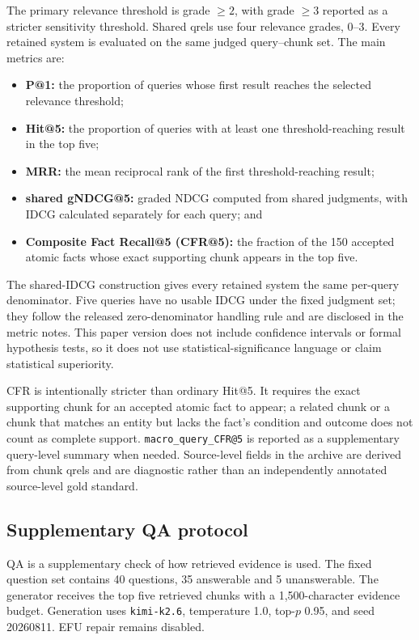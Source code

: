 The primary relevance threshold is grade $\geq 2$, with grade $\geq 3$ reported as a stricter sensitivity threshold. Shared qrels use four relevance grades, 0--3. Every retained system is evaluated on the same judged query--chunk set. The main metrics are:

\begin{itemize}
\item \textbf{P@1:} the proportion of queries whose first result reaches the selected relevance threshold;
\item \textbf{Hit@5:} the proportion of queries with at least one threshold-reaching result in the top five;
\item \textbf{MRR:} the mean reciprocal rank of the first threshold-reaching result;
\item \textbf{shared gNDCG@5:} graded NDCG computed from shared judgments, with IDCG calculated separately for each query; and
\item \textbf{Composite Fact Recall@5 (CFR@5):} the fraction of the 150 accepted atomic facts whose exact supporting chunk appears in the top five.
\end{itemize}

The shared-IDCG construction gives every retained system the same per-query denominator. Five queries have no usable IDCG under the fixed judgment set; they follow the released zero-denominator handling rule and are disclosed in the metric notes. This paper version does not include confidence intervals or formal hypothesis tests, so it does not use statistical-significance language or claim statistical superiority.

CFR is intentionally stricter than ordinary Hit@5. It requires the exact supporting chunk for an accepted atomic fact to appear; a related chunk or a chunk that matches an entity but lacks the fact's condition and outcome does not count as complete support. \texttt{macro\_query\_CFR@5} is reported as a supplementary query-level summary when needed. Source-level fields in the archive are derived from chunk qrels and are diagnostic rather than an independently annotated source-level gold standard.

\subsection{Supplementary QA protocol}

QA is a supplementary check of how retrieved evidence is used. The fixed question set contains 40 questions, 35 answerable and 5 unanswerable. The generator receives the top five retrieved chunks with a 1,500-character evidence budget. Generation uses \texttt{kimi-k2.6}, temperature 1.0, top-$p$ 0.95, and seed 20260811. EFU repair remains disabled.

